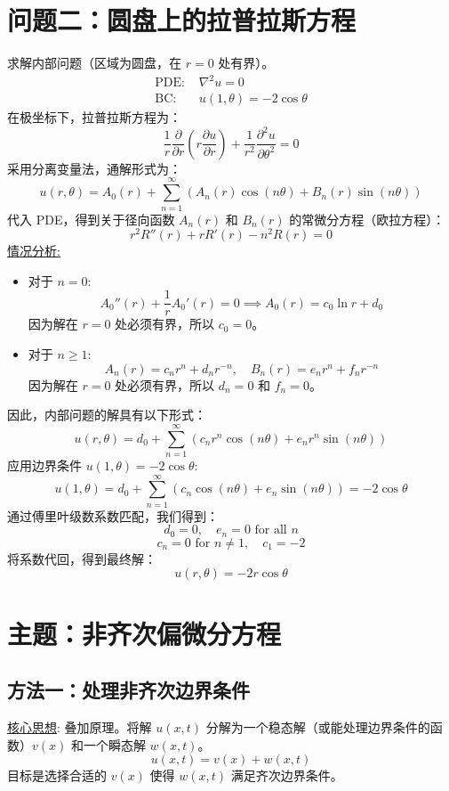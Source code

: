 \documentclass{article}
\begin{document}
	\section*{问题二：圆盘上的拉普拉斯方程}
	求解内部问题（区域为圆盘，在 $r=0$ 处有界）。
	\begin{align*}
		\text{PDE: } & \nabla^2 u = 0 \\
		\text{BC: }  & u(1, \theta) = -2\cos\theta
	\end{align*}
	在极坐标下，拉普拉斯方程为：
	$$
	\frac{1}{r}\frac{\partial}{\partial r}\left(r\frac{\partial u}{\partial r}\right) + \frac{1}{r^2}\frac{\partial^2 u}{\partial \theta^2} = 0
	$$
	采用分离变量法，通解形式为：
	$$
	u(r,\theta) = A_0(r) + \sum_{n=1}^{\infty} \left( A_n(r)\cos(n\theta) + B_n(r)\sin(n\theta) \right)
	$$
	代入 PDE，得到关于径向函数 $A_n(r)$ 和 $B_n(r)$ 的常微分方程（欧拉方程）：
	$$
	r^2 R''(r) + r R'(r) - n^2 R(r) = 0
	$$
	\underline{情况分析:}
	\begin{itemize}
		\item 对于 $n=0$:
		$$ A_0''(r) + \frac{1}{r}A_0'(r) = 0 \implies A_0(r) = c_0 \ln r + d_0 $$
		因为解在 $r=0$ 处必须有界，所以 $c_0 = 0$。
		
		\item 对于 $n \ge 1$:
		$$ A_n(r) = c_n r^n + d_n r^{-n}, \quad B_n(r) = e_n r^n + f_n r^{-n} $$
		因为解在 $r=0$ 处必须有界，所以 $d_n = 0$ 和 $f_n = 0$。
	\end{itemize}
	因此，内部问题的解具有以下形式：
	$$
	u(r,\theta) = d_0 + \sum_{n=1}^{\infty} \left( c_n r^n \cos(n\theta) + e_n r^n \sin(n\theta) \right)
	$$
	应用边界条件 $u(1,\theta) = -2\cos\theta$:
	$$
	u(1,\theta) = d_0 + \sum_{n=1}^{\infty} \left( c_n \cos(n\theta) + e_n \sin(n\theta) \right) = -2\cos\theta
	$$
	通过傅里叶级数系数匹配，我们得到：
	$$
	d_0=0, \quad e_n=0 \text{ for all } n
	$$
	$$
	c_n=0 \text{ for } n \neq 1, \quad c_1 = -2
	$$
	将系数代回，得到最终解：
	$$
	u(r,\theta) = -2r\cos\theta
	$$
	
	\section*{主题：非齐次偏微分方程}
	
	\subsection*{方法一：处理非齐次边界条件}
	\underline{核心思想}: 叠加原理。将解 $u(x,t)$ 分解为一个稳态解（或能处理边界条件的函数）$v(x)$ 和一个瞬态解 $w(x,t)$。
	$$ u(x,t) = v(x) + w(x,t) $$
	目标是选择合适的 $v(x)$ 使得 $w(x,t)$ 满足齐次边界条件。
	
\end{document}
